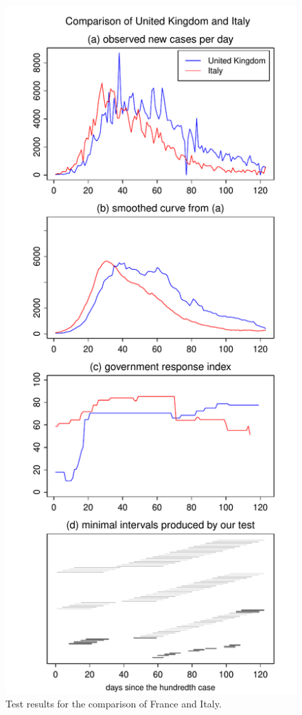 \documentclass[a4paper,12pt]{article}
\numberwithin{equation}{section}
\begin{document}
\begin{figure}[p!]
\begin{minipage}[t]{0.49\textwidth}
\caption{Test results for the comparison of France and Italy.}\label{s:fig:France:Italy}
\end{minipage}
\hspace{0.25cm}
\begin{minipage}[t]{0.49\textwidth}
\includegraphics[width=\textwidth]{plots/GBR_vs_ITA}

\end{minipage}
\end{figure}
\end{document}
